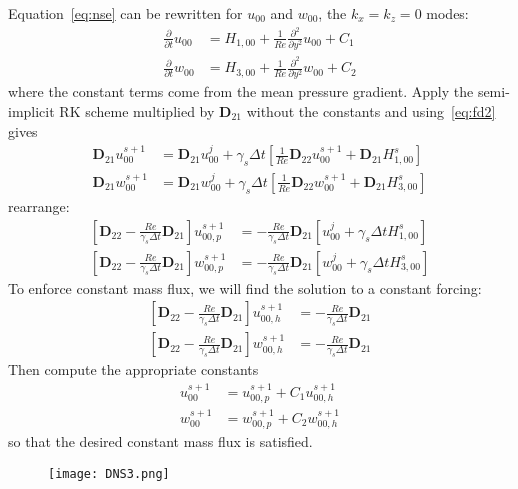 \documentclass[titlepage,12pt,letter]{article}
\newcommand{\p}{\partial}
\newcommand{\bracket}[1]{\left[ #1 \right]}
\newcommand{\re}{Re}
\numberwithin{equation}{section}
\begin{document}
Equation~\eqref{eq:nse} can be rewritten for $u_{00}$ and $w_{00}$, the $k_x = k_z = 0$ modes:
\begin{align*}
	\frac{\p}{\p t} u_{00}  &= H_{1,00} + \frac{1}{\re} \frac{\p^2}{\p y^2} u_{00} + C_1\\
	\frac{\p}{\p t} w_{00}  &= H_{3,00} + \frac{1}{\re} \frac{\p^2}{\p y^2} w_{00} + C_2
\end{align*} 
where the constant terms come from the mean pressure gradient. Apply the semi-implicit RK scheme multiplied by $\bm{D}_{21}$ without the constants and using~\eqref{eq:fd2} gives
\begin{align*}
	\bm{D}_{21} u_{00}^{s+1} &= \bm{D}_{21} u_{00}^j + \gamma_s \Delta t \bracket{\frac{1}{\re} \bm{D}_{22} u_{00}^{s+1} +  \bm{D}_{21} H_{1,00}^s}\\
	\bm{D}_{21} w_{00}^{s+1} &= \bm{D}_{21} w_{00}^j + \gamma_s \Delta t \bracket{\frac{1}{\re} \bm{D}_{22} w_{00}^{s+1} +  \bm{D}_{21} H_{3,00}^s}
\end{align*}
rearrange:
\begin{align}
	\bracket{ \bm{D}_{22} - \frac{\re}{\gamma_s \Delta t}\bm{D}_{21} } u_{00,p}^{s+1}&= - \frac{\re}{\gamma_s \Delta t}\bm{D}_{21} \bracket{u_{00}^j +   \gamma_s \Delta t H_{1,00}^s} \label{eq:u00p}\\
	\bracket{ \bm{D}_{22} - \frac{\re}{\gamma_s \Delta t}\bm{D}_{21} } w_{00,p}^{s+1}&= - \frac{\re}{\gamma_s \Delta t}\bm{D}_{21} \bracket{w_{00}^j +    \gamma_s \Delta t H_{3,00}^s} \label{eq:w00p}
\end{align}
To enforce constant mass flux, we will find the solution to a constant forcing:
\begin{align}
	\bracket{ \bm{D}_{22} - \frac{\re}{\gamma_s \Delta t}\bm{D}_{21} } u_{00,h}^{s+1}&= - \frac{\re}{\gamma_s \Delta t}\bm{D}_{21} \label{eq:u00h}\\
	\bracket{ \bm{D}_{22} - \frac{\re}{\gamma_s \Delta t}\bm{D}_{21} } w_{00,h}^{s+1}&= - \frac{\re}{\gamma_s \Delta t}\bm{D}_{21} \label{eq:w00h}
\end{align}
Then compute the appropriate constants
\begin{align}
	 u_{00}^{s+1}&= u_{00,p}^{s+1} + C_1 u_{00,h}^{s+1}\\
	 w_{00}^{s+1}&= w_{00,p}^{s+1} + C_2 w_{00,h}^{s+1}
\end{align}
so that the desired constant mass flux is satisfied.

\begin{figure}[H]
	\centering
	\texttt{[image: DNS3.png]}
\end{figure}
\end{document}
